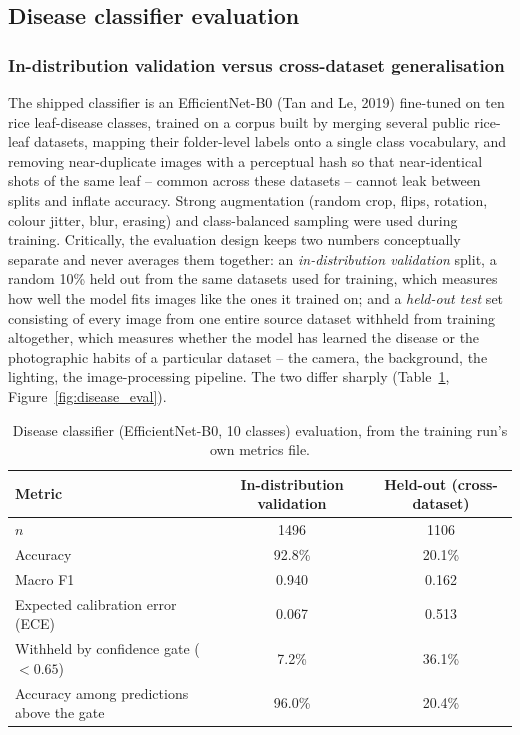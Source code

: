 \documentclass[11pt,a4paper]{article}
\begin{document}
\subsection{Disease classifier evaluation}

\subsubsection{In-distribution validation versus cross-dataset generalisation}

The shipped classifier is an EfficientNet-B0 (Tan and Le, 2019) fine-tuned on ten rice leaf-disease classes, trained on a corpus built by merging several public rice-leaf datasets, mapping their folder-level labels onto a single class vocabulary, and removing near-duplicate images with a perceptual hash so that near-identical shots of the same leaf -- common across these datasets -- cannot leak between splits and inflate accuracy. Strong augmentation (random crop, flips, rotation, colour jitter, blur, erasing) and class-balanced sampling were used during training. Critically, the evaluation design keeps two numbers conceptually separate and never averages them together: an \emph{in-distribution validation} split, a random 10\% held out from the same datasets used for training, which measures how well the model fits images like the ones it trained on; and a \emph{held-out test} set consisting of every image from one entire source dataset withheld from training altogether, which measures whether the model has learned the disease or the photographic habits of a particular dataset -- the camera, the background, the lighting, the image-processing pipeline. The two differ sharply (Table~\ref{tab:classifier}, Figure~\ref{fig:disease_eval}).

\begin{table}[htbp]
\centering
\caption{Disease classifier (EfficientNet-B0, 10 classes) evaluation, from the training run's own metrics file.}
\label{tab:classifier}
\begin{tabular}{lcc}
\toprule
Metric & In-distribution validation & Held-out (cross-dataset) \\
\midrule
$n$ & 1496 & 1106 \\
Accuracy & 92.8\% & 20.1\% \\
Macro F1 & 0.940 & 0.162 \\
Expected calibration error (ECE) & 0.067 & 0.513 \\
Withheld by confidence gate ($<0.65$) & 7.2\% & 36.1\% \\
Accuracy among predictions above the gate & 96.0\% & 20.4\% \\
\bottomrule
\end{tabular}
\end{table}
\end{document}

